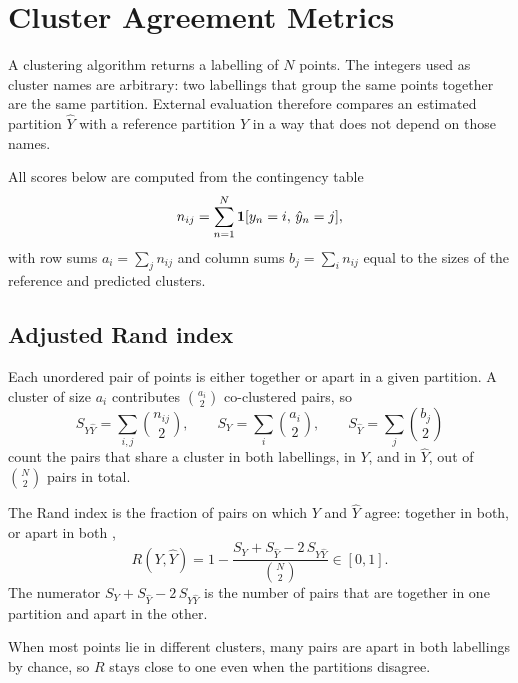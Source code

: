 \section{Cluster Agreement Metrics}\label{sec:bg:cluster_metrics}

A clustering algorithm returns a labelling of $N$ points.
The integers used as cluster names are arbitrary: two labellings that group the same points together are the same partition.
External evaluation therefore compares an estimated partition $\hat{Y}$ with a reference partition $Y$ in a way that does not depend on those names.

All scores below are computed from the contingency table
\begin{equation}\label{eq:bg:contingency}
  n_{ij}=\sum_{n=1}^{N}\mathbf{1}[y_n=i,\,\hat{y}_n=j],
\end{equation}
with row sums $a_i=\sum_j n_{ij}$ and column sums $b_j=\sum_i n_{ij}$ equal to the sizes of the reference and predicted clusters.

\subsection*{Adjusted Rand index}

Each unordered pair of points is either together or apart in a given partition.
A cluster of size $a_i$ contributes $\binom{a_i}{2}$ co-clustered pairs, so
\begin{equation}\label{eq:bg:pair_counts}
  S_{Y\hat{Y}}=\sum_{i,j}\binom{n_{ij}}{2},\qquad
  S_Y=\sum_i\binom{a_i}{2},\qquad
  S_{\hat{Y}}=\sum_j\binom{b_j}{2}
\end{equation}
count the pairs that share a cluster in both labellings, in $Y$, and in $\hat{Y}$, out of $\binom{N}{2}$ pairs in total.

The Rand index is the fraction of pairs on which $Y$ and $\hat{Y}$ agree: together in both, or apart in both \parencite{hubert1985comparing},
\begin{equation}\label{eq:bg:rand}
  R(Y,\hat{Y})
  =
  1 - \frac{S_Y + S_{\hat{Y}} - 2\,S_{Y\hat{Y}}}{\binom{N}{2}}
  \in[0,1].
\end{equation}
The numerator $S_Y+S_{\hat{Y}}-2\,S_{Y\hat{Y}}$ is the number of pairs that are together in one partition and apart in the other.

When most points lie in different clusters, many pairs are apart in both labellings by chance, so $R$ stays close to one even when the partitions disagree.


